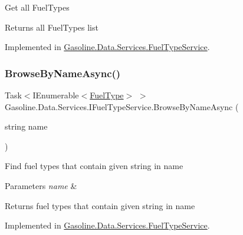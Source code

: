 Get all Fuel\+Types 

\begin{DoxyReturn}{Returns}
all Fuel\+Types list
\end{DoxyReturn}


Implemented in \mbox{\hyperlink{class_gasoline_1_1_data_1_1_services_1_1_fuel_type_service_a8255c7d8d62590890d09b618ef679b41}{Gasoline.\+Data.\+Services.\+Fuel\+Type\+Service}}.

\mbox{\label{interface_gasoline_1_1_data_1_1_services_1_1_i_fuel_type_service_a3641a00f790e0aabb9decc8e9a5e7dc9}} 
\subsubsection{\texorpdfstring{BrowseByNameAsync()}{BrowseByNameAsync()}}
{\footnotesize\ttfamily Task$<$I\+Enumerable$<$\mbox{\hyperlink{class_gasoline_1_1_data_1_1_models_1_1_fuel_type}{Fuel\+Type}}$>$ $>$ Gasoline.\+Data.\+Services.\+I\+Fuel\+Type\+Service.\+Browse\+By\+Name\+Async (\begin{DoxyParamCaption}\item[{string}]{name }\end{DoxyParamCaption})}



Find fuel types that contain given string in name 


\begin{DoxyParams}{Parameters}
{\em name} & \\
\hline
\end{DoxyParams}
\begin{DoxyReturn}{Returns}
fuel types that contain given string in name
\end{DoxyReturn}


Implemented in \mbox{\hyperlink{class_gasoline_1_1_data_1_1_services_1_1_fuel_type_service_a3aff4edf14e7e4b320268f0383a9209c}{Gasoline.\+Data.\+Services.\+Fuel\+Type\+Service}}.

\mbox{\label{interface_gasoline_1_1_data_1_1_services_1_1_i_fuel_type_service_a3abc3e8b5c004ce0da2645017c971114}} 
